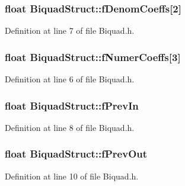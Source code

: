 \subsubsection[{\texorpdfstring{f\+Denom\+Coeffs}{fDenomCoeffs}}]{\setlength{\rightskip}{0pt plus 5cm}float Biquad\+Struct\+::f\+Denom\+Coeffs\mbox{[}2\mbox{]}}\hypertarget{struct_biquad_struct_ad8bf7510e65e56826667dc1b842c6d9d}{}\label{struct_biquad_struct_ad8bf7510e65e56826667dc1b842c6d9d}


Definition at line 7 of file Biquad.\+h.

\subsubsection[{\texorpdfstring{f\+Numer\+Coeffs}{fNumerCoeffs}}]{\setlength{\rightskip}{0pt plus 5cm}float Biquad\+Struct\+::f\+Numer\+Coeffs\mbox{[}3\mbox{]}}\hypertarget{struct_biquad_struct_ac04e8600119cfdbfc49ac21ea8d176fc}{}\label{struct_biquad_struct_ac04e8600119cfdbfc49ac21ea8d176fc}


Definition at line 6 of file Biquad.\+h.

\subsubsection[{\texorpdfstring{f\+Prev\+In}{fPrevIn}}]{\setlength{\rightskip}{0pt plus 5cm}float Biquad\+Struct\+::f\+Prev\+In}\hypertarget{struct_biquad_struct_a3935a6bcf1c59bf9fffd906350769bbd}{}\label{struct_biquad_struct_a3935a6bcf1c59bf9fffd906350769bbd}


Definition at line 8 of file Biquad.\+h.

\subsubsection[{\texorpdfstring{f\+Prev\+Out}{fPrevOut}}]{\setlength{\rightskip}{0pt plus 5cm}float Biquad\+Struct\+::f\+Prev\+Out}\hypertarget{struct_biquad_struct_ae206737241cc7a14a4aa0b0d1fa0e3a1}{}\label{struct_biquad_struct_ae206737241cc7a14a4aa0b0d1fa0e3a1}


Definition at line 10 of file Biquad.\+h.

